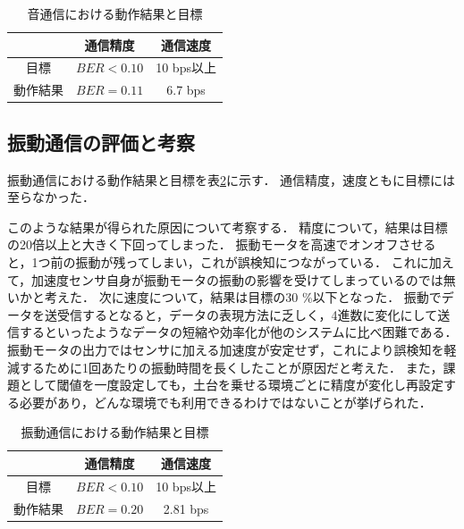 
\begin{table}[tb]
    \centering
    \caption{音通信における動作結果と目標}
    \label{table:sound}
    \begin{tabular}{|c|c|c|} \hline
            &通信精度  &通信速度  \\ \hline
        目標 & $BER < 0.10$ &10 bps以上 \\ \hline
        動作結果 &$BER = 0.11$ &6.7 bps\\ \hline
    \end{tabular}
\end{table}

\subsection{振動通信の評価と考察}
振動通信における動作結果と目標を表\ref{table:vibration}に示す．
通信精度，速度ともに目標には至らなかった．
\par
このような結果が得られた原因について考察する．
精度について，結果は目標の20倍以上と大きく下回ってしまった．
振動モータを高速でオンオフさせると，1つ前の振動が残ってしまい，これが誤検知につながっている．
これに加えて，加速度センサ自身が振動モータの振動の影響を受けてしまっているのでは無いかと考えた．
次に速度について，結果は目標の30 \%以下となった．
振動でデータを送受信するとなると，データの表現方法に乏しく，4進数に変化にして送信するといったようなデータの短縮や効率化が他のシステムに比べ困難である．
振動モータの出力ではセンサに加える加速度が安定せず，これにより誤検知を軽減するために1回あたりの振動時間を長くしたことが原因だと考えた．
また，課題として閾値を一度設定しても，土台を乗せる環境ごとに精度が変化し再設定する必要があり，どんな環境でも利用できるわけではないことが挙げられた．


\begin{table}[tb]
    \centering
    \caption{振動通信における動作結果と目標}
    \label{table:vibration}
    \begin{tabular}{|c|c|c|} \hline
            &通信精度  &通信速度  \\ \hline
        目標 & $BER < 0.10$ &10 bps以上 \\ \hline
        動作結果 &$BER = 0.20$ &2.81 bps\\ \hline
    \end{tabular}
\end{table}


